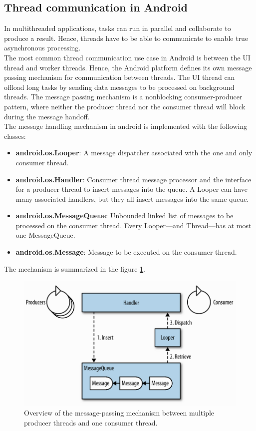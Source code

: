 \subsection{ Thread communication in Android}
In multithreaded applications, tasks can run in parallel and collaborate to produce a result. Hence, threads have to be able to communicate to enable true asynchronous processing.\\
The most common thread communication use case in Android is between the UI thread and worker threads. Hence, the Android platform defines its own message passing mechanism for communication between threads. The UI thread can offload long tasks by sending data messages to be processed on background threads. The message passing mechanism is a nonblocking consumer-producer pattern, where neither the producer thread nor the consumer thread will block during the message handoff.\\
The message handling mechanism in android is implemented with the following classes:
\begin{itemize}
	\item \textbf{android.os.Looper}: A message dispatcher associated with the one and only consumer thread.
	\item \textbf{android.os.Handler}: Consumer thread message processor and the interface for a producer thread to insert messages into the queue. A Looper can have many associated handlers, but they all insert messages into the same queue.
	\item \textbf{android.os.MessageQueue}: Unbounded linked list of messages to be processed on the consumer thread. Every Looper—and Thread—has at most one MessageQueue.
	\item \textbf{android.os.Message}: Message to be executed on the consumer thread.
\end{itemize}
	The mechanism is summarized in the figure \ref{fig7.2}.
\begin{figure}[ht!]
	\centering
	\includegraphics[width=120mm]{figures/ch7/2.png}
	\caption{Overview of the message-passing mechanism between multiple producer threads and one consumer thread.}
	\label{fig7.2}
\end{figure}
